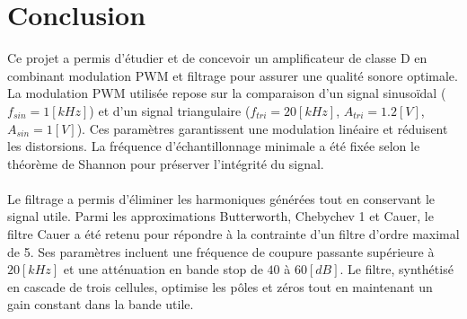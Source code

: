 \documentclass[a4paper,12pt,oneside]{report}	%
\begin{document}
    \section*{Conclusion}
        Ce projet a permis d’étudier et de concevoir un amplificateur de classe D en combinant modulation PWM et filtrage pour assurer une qualité sonore optimale. La modulation PWM utilisée repose sur la comparaison d’un signal sinusoïdal ($f_{sin} = 1 [kHz]$) et d’un signal triangulaire ($f_{tri} = 20 [kHz]$, $ A_{tri} = 1.2 [V]$, $ A_{sin} = 1 [V]$). Ces paramètres garantissent une modulation linéaire et réduisent les distorsions. La fréquence d’échantillonnage minimale a été fixée selon le théorème de Shannon pour préserver l’intégrité du signal.\\\\
        Le filtrage a permis d’éliminer les harmoniques générées tout en conservant le signal utile. Parmi les approximations Butterworth, Chebychev 1 et Cauer, le filtre Cauer a été retenu pour répondre à la contrainte d’un filtre d'ordre maximal de 5. Ses paramètres incluent une fréquence de coupure passante supérieure à $20 [kHz]$ et une atténuation en bande stop de $40$ à $60 [dB]$. Le filtre, synthétisé en cascade de trois cellules, optimise les pôles et zéros tout en maintenant un gain constant dans la bande utile.
\end{document}
